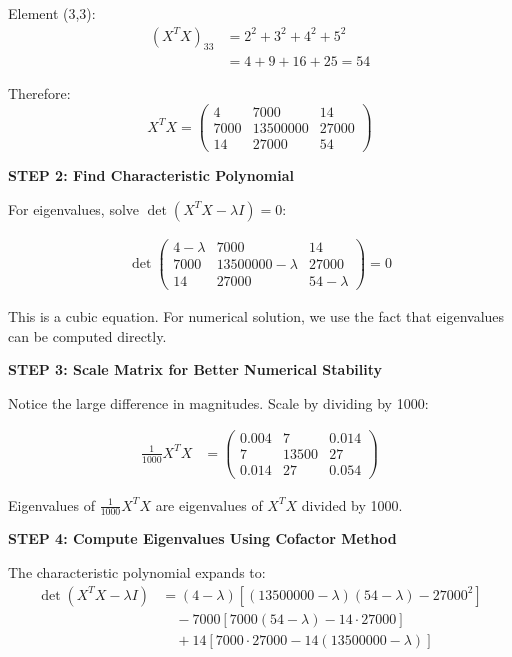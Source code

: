 \documentclass[12pt]{article}
\begin{document}
\begin{solution}
Element (3,3):
\begin{align*}
(X^TX)_{33} &= 2^2 + 3^2 + 4^2 + 5^2 \\
&= 4 + 9 + 16 + 25 = 54
\end{align*}

Therefore:
\[
X^TX = \begin{pmatrix}
4 & 7000 & 14 \\
7000 & 13500000 & 27000 \\
14 & 27000 & 54
\end{pmatrix}
\]

\textbf{STEP 2: Find Characteristic Polynomial}

For eigenvalues, solve $\det(X^TX - \lambda I) = 0$:

\begin{align*}
\det\begin{pmatrix}
4-\lambda & 7000 & 14 \\
7000 & 13500000-\lambda & 27000 \\
14 & 27000 & 54-\lambda
\end{pmatrix} = 0
\end{align*}

This is a cubic equation. For numerical solution, we use the fact that eigenvalues can be computed directly.

\textbf{STEP 3: Scale Matrix for Better Numerical Stability}

Notice the large difference in magnitudes. Scale by dividing by 1000:

\begin{align*}
\frac{1}{1000}X^TX &= \begin{pmatrix}
0.004 & 7 & 0.014 \\
7 & 13500 & 27 \\
0.014 & 27 & 0.054
\end{pmatrix}
\end{align*}

Eigenvalues of $\frac{1}{1000}X^TX$ are eigenvalues of $X^TX$ divided by 1000.

\textbf{STEP 4: Compute Eigenvalues Using Cofactor Method}

The characteristic polynomial expands to:
\begin{align*}
\det(X^TX - \lambda I) &= (4-\lambda)[(13500000-\lambda)(54-\lambda) - 27000^2] \\
&\quad - 7000[7000(54-\lambda) - 14 \cdot 27000] \\
&\quad + 14[7000 \cdot 27000 - 14(13500000-\lambda)]
\end{align*}


\end{solution}
\end{document}
